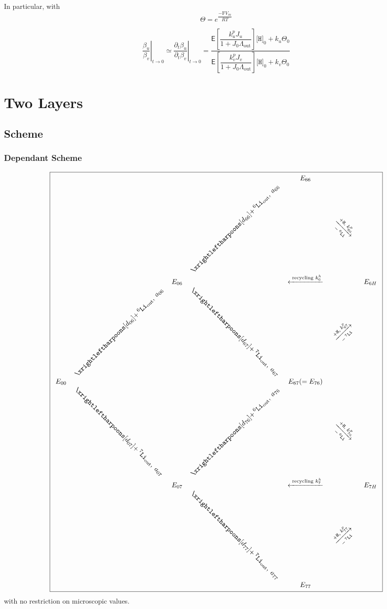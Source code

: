\documentclass[aps,onecolumn,11pt]{revtex4}
\newcommand{\mychem}[1]{\mathtt{#1}}
\newcommand{\myconc}[1]{\big[#1\big]}
\newcommand{\Faraday}{\mathrm{F}}
\newcommand{\spLi}[1]{{\!~^{#1}\mychem{Li}}}
\newcommand{\spproton}{\mychem{H}}
\newcommand{\proton}{\myconc{\spproton}}
\newcommand{\myout}[1]{{#1}_{\mathrm{out}}}
\newcommand{\spLiOut}[1]{\myout{\spLi{#1}}}
\newcommand{\myrotate}[2]{\rotatebox[origin=c]{#1}{#2}}
\newcommand{\LiAll}{\Lambda}
\newcommand{\LiAllOut}{\myout{\LiAll}}
\begin{document}
In particular, with
\begin{equation}
	\Theta = e^{\dfrac{-\Faraday V_m }{RT}}
\end{equation}

\begin{equation}
	\left.\dfrac{\beta_u}{\beta_v}\right\vert_{t\to0} \simeq \left.\dfrac{\partial_t \beta_u}{\partial_t\beta_v}\right\vert_{t\to0}
	= \dfrac{\mathsf{E} \left[\dfrac{k^p_u J_u}{1+J_0 \LiAllOut}\right] \proton_0 + k_u  \Theta_0
	}
	{
	\mathsf{E} \left[\dfrac{k^p_v J_v}{1+J_0 \LiAllOut}\right] \proton_0 + k_v  \Theta_0
	}
\end{equation}


\section{Two Layers}
\subsection{Scheme}
\subsubsection{Dependant Scheme}
{
\Large
\begin{equation}
\boxed{
\begin{array}{ccccccc}
 & &        &                                                  & E_{66} & & \\
 & &        & \myrotate{45}{$\xrightleftharpoons[d_{66}]{+\spLiOut{6},\;a_{66}}$} & &  \myrotate{-45}{$\xrightarrow[-\spLi{6}]{+ \spproton, \; k^p_{66}}$}& \\
 & & E_{06} &  & \xleftarrow{\text{ recycling } k^h_6 } & & E_{6H}\\
 &  \myrotate{45}{$\xrightleftharpoons[d_{06}]{+\spLiOut{6},\;a_{06}}$} &   & \myrotate{-45}{$\xrightleftharpoons[d_{67}]{+\spLiOut{7},\;a_{67}}$} & & \myrotate{45}{$\xrightarrow[-\spLi{7}]{+ \spproton, \; k^p_{67}}$}&\\
E_{00} & &  & & E_{67}(=E_{76}) & & \\ 
  & \myrotate{-45}{$\xrightleftharpoons[d_{07}]{+\spLiOut{7},\;a_{07}}$} &  & \myrotate{45}{$\xrightleftharpoons[d_{76}]{+\spLiOut{6},\;a_{76}}$} & & \myrotate{-45}{$\xrightarrow[-\spLi{6}]{+ \spproton, \; k^p_{76}}$} & \\
  & & E_{07} &   & \xleftarrow{\text{ recycling } k^h_7 } & & E_{7H}\\
  & &  & \myrotate{-45}{$\xrightleftharpoons[d_{77}]{+\spLiOut{7},\;a_{77}}$} & & \myrotate{45}{$\xrightarrow[-\spLi{7}]{+ \spproton, \; k^p_{77}}$} &\\
  & &  &  & E_{77} & &\\

 \end{array}
 }
\end{equation}
}
with no restriction on microscopic values.
\end{document}
